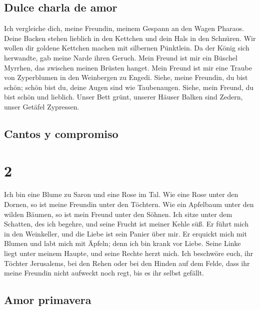 \hypertarget{dulce-charla-de-amor}{%
\subsection{Dulce charla de amor}\label{dulce-charla-de-amor}}

 Ich vergleiche dich, meine Freundin, meinem Gespann an
den Wagen Pharaos.  Deine Backen stehen lieblich in den
Kettchen und dein Hals in den Schnüren.  Wir wollen dir
goldene Kettchen machen mit silbernen Pünktlein.  Da der
König sich herwandte, gab meine Narde ihren Geruch.  Mein
Freund ist mir ein Büschel Myrrhen, das zwischen meinen Brüsten hanget.
 Mein Freund ist mir eine Traube von Zyperblumen in den
Weinbergen zu Engedi.  Siehe, meine Freundin, du bist
schön; schön bist du, deine Augen sind wie Taubenaugen. 
Siehe, mein Freund, du bist schön und lieblich. Unser Bett grünt,
 unserer Häuser Balken sind Zedern, unser Getäfel
Zypressen.

\hypertarget{cantos-y-compromiso}{%
\subsection{Cantos y compromiso}\label{cantos-y-compromiso}}

\hypertarget{section-1}{%
\section{2}\label{section-1}}

 Ich bin eine Blume zu Saron und eine Rose im Tal.
 Wie eine Rose unter den Dornen, so ist meine Freundin
unter den Töchtern.  Wie ein Apfelbaum unter den wilden
Bäumen, so ist mein Freund unter den Söhnen. Ich sitze unter dem
Schatten, des ich begehre, und seine Frucht ist meiner Kehle süß.
 Er führt mich in den Weinkeller, und die Liebe ist sein
Panier über mir.  Er erquickt mich mit Blumen und labt
mich mit Äpfeln; denn ich bin krank vor Liebe.  Seine
Linke liegt unter meinem Haupte, und seine Rechte herzt mich.
 Ich beschwöre euch, ihr Töchter Jerusalems, bei den Rehen
oder bei den Hinden auf dem Felde, dass ihr meine Freundin nicht
aufweckt noch regt, bis es ihr selbst gefällt.

\hypertarget{amor-primavera}{%
\subsection{Amor primavera}\label{amor-primavera}}

